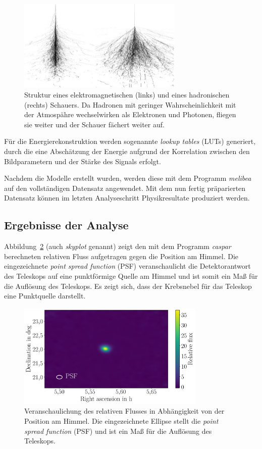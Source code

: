 \begin{figure}
  \centering
  \includegraphics[width=0.7\textwidth]{figures/gamma_hadron.png}
  \caption{Struktur eines elektromagnetischen (links) und eines hadronischen
  (rechts) Schauers. Da Hadronen mit geringer Wahrscheinlichkeit mit der
  Atmospähre wechselwirken als Elektronen und Photonen, fliegen sie weiter und
  der Schauer fächert weiter auf.}
  \label{fig:gamma_hadron}
\end{figure}

Für die Energierekonstruktion werden sogenannte \textit{lookup tables} (LUTs)
generiert, durch die eine Abschätzung der Energie aufgrund der Korrelation
zwischen den Bildparametern und der Stärke des Signals erfolgt.

Nachdem die Modelle erstellt wurden, werden diese mit dem Programm
\textit{melibea} auf den vollständigen Datensatz angewendet. Mit dem nun fertig
präparierten Datensatz können im letzten Analyseschritt Physikresultate
produziert werden.

\subsection{Ergebnisse der Analyse}

Abbildung~\ref{fig:skyplot} (auch \textit{skyplot} genannt) zeigt den mit dem
Programm \textit{caspar} berechneten relativen Fluss aufgetragen gegen die
Position am Himmel. Die eingezeichnete \textit{point spread function} (PSF)
veranschaulicht die Detektorantwort des Teleskops auf eine punktförmige Quelle
am Himmel und ist somit ein Maß für die Auflösung des Teleskops. Es zeigt sich,
dass der Krebsnebel für das Teleskop eine Punktquelle darstellt.

\begin{figure}[H]
  \centering
  \includegraphics[width=0.8\textwidth]{figures/caspar_flux_skymap.pdf}
  \caption{Veranschaulichung des relativen Flusses in Abhängigkeit von der
  Position am Himmel. Die eingezeichnete Ellipse stellt die
  \textit{point spread function} (PSF) und ist ein Maß für die Auflösung des
  Teleskops.}
  \label{fig:skyplot}
\end{figure}


